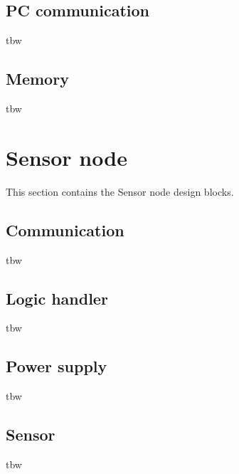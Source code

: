 \subsection{PC communication}
tbw

\subsection{Memory}
tbw

\section{Sensor node}
This section contains the Sensor node design blocks.
\subsection{Communication}
tbw

\subsection{Logic handler}
tbw

\subsection{Power supply}
tbw

\subsection{Sensor}
tbw